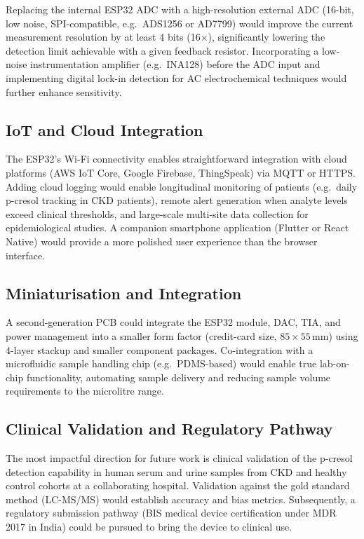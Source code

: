 Replacing the internal ESP32 ADC with a high-resolution external ADC (16-bit, low noise, SPI-compatible, e.g.\ ADS1256 or AD7799) would improve the current measurement resolution by at least 4 bits (16$\times$), significantly lowering the detection limit achievable with a given feedback resistor. Incorporating a low-noise instrumentation amplifier (e.g.\ INA128) before the ADC input and implementing digital lock-in detection for AC electrochemical techniques would further enhance sensitivity.

\subsection{IoT and Cloud Integration}

The ESP32's Wi-Fi connectivity enables straightforward integration with cloud platforms (AWS IoT Core, Google Firebase, ThingSpeak) via MQTT or HTTPS. Adding cloud logging would enable longitudinal monitoring of patients (e.g.\ daily p-cresol tracking in CKD patients), remote alert generation when analyte levels exceed clinical thresholds, and large-scale multi-site data collection for epidemiological studies. A companion smartphone application (Flutter or React Native) would provide a more polished user experience than the browser interface.

\subsection{Miniaturisation and Integration}

A second-generation PCB could integrate the ESP32 module, DAC, TIA, and power management into a smaller form factor (credit-card size, $85 \times 55$\,mm) using 4-layer stackup and smaller component packages. Co-integration with a microfluidic sample handling chip (e.g.\ PDMS-based) would enable true lab-on-chip functionality, automating sample delivery and reducing sample volume requirements to the microlitre range.

\subsection{Clinical Validation and Regulatory Pathway}

The most impactful direction for future work is clinical validation of the p-cresol detection capability in human serum and urine samples from CKD and healthy control cohorts at a collaborating hospital. Validation against the gold standard method (LC-MS/MS) would establish accuracy and bias metrics. Subsequently, a regulatory submission pathway (BIS medical device certification under MDR 2017 in India) could be pursued to bring the device to clinical use.

